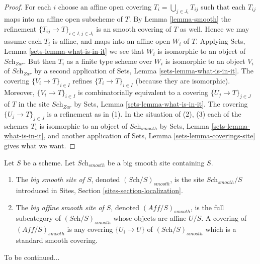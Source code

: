 \begin{proof}
For each $i$ choose an affine open covering $T_i = \bigcup_{j \in J_i} T_{ij}$
such that each $T_{ij}$ maps into an affine open subscheme of $T$. By
Lemma \ref{lemma-smooth}
the refinement $\{T_{ij} \to T\}_{i \in I, j \in J_i}$ is an smooth covering
of $T$ as well. Hence we may assume each $T_i$ is affine, and maps into
an affine open $W_i$ of $T$. Applying
Sets, Lemma \ref{sets-lemma-what-is-in-it}
we see that $W_i$ is isomorphic to an object of $\textit{Sch}_{Zar}$.
But then $T_i$ as a finite type scheme over $W_i$
is isomorphic to an object $V_i$ of $\textit{Sch}_{Zar}$ by a second
application of
Sets, Lemma \ref{sets-lemma-what-is-in-it}.
The covering $\{V_i \to T\}_{i \in I}$ refines $\{T_i \to T\}_{i \in I}$
(because they are isomorphic).
Moreover, $\{V_i \to T\}_{i \in I}$ is combinatorially equivalent to a
covering $\{U_j \to T\}_{j \in J}$ of $T$ in the site
$\textit{Sch}_{Zar}$ by
Sets, Lemma \ref{sets-lemma-what-is-in-it}.
The covering $\{U_j \to T\}_{j \in J}$ is a refinement as in (1).
In the situation of (2), (3) each of the
schemes $T_i$ is isomorphic to an object of $\textit{Sch}_{smooth}$ by
Sets, Lemma \ref{sets-lemma-what-is-in-it},
and another application of
Sets, Lemma \ref{sets-lemma-coverings-site}
gives what we want.
\end{proof}

\begin{definition}
\label{definition-big-small-smooth}
Let $S$ be a scheme. Let $\textit{Sch}_{smooth}$ be a big smooth
site containing $S$.
\begin{enumerate}
\item The {\it big smooth site of $S$}, denoted
$(\textit{Sch}/S)_{smooth}$, is the site $\textit{Sch}_{smooth}/S$
introduced in Sites, Section \ref{sites-section-localization}.
\item The {\it big affine smooth site of $S$}, denoted
$(\textit{Aff}/S)_{smooth}$, is the full subcategory of
$(\textit{Sch}/S)_{smooth}$ whose objects are affine $U/S$.
A covering of $(\textit{Aff}/S)_{smooth}$ is any covering
$\{U_i \to U\}$ of $(\textit{Sch}/S)_{smooth}$ which is a
standard smooth covering.
\end{enumerate}
\end{definition}

\noindent
To be continued...












